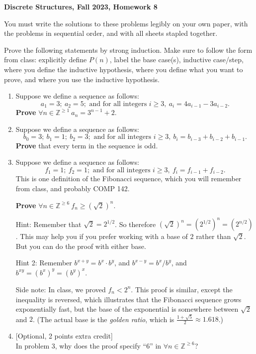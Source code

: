 \documentclass[12pt, letterpaper]{report}
\newcommand{\Z}{\mathbb{Z}}
\begin{document}
{\textbf{Discrete Structures, Fall 2023, Homework 8}}

\bigskip

You must write the solutions to these problems legibly on your own paper, with
the problems in sequential order, and with all sheets stapled together.

\bigskip

Prove the following statements by strong induction.  Make sure to follow the form from class:
explicitly define $P(n)$, label the base case(s), inductive case/step, where you define the inductive hypothesis, where you define what you want to 
prove,
and where you use the inductive hypothesis.  
\begin{enumerate}

\item Suppose we define a sequence as follows: 
$$
a_1 = 3; \ a_2 = 5; \text{ and for all integers }i \geq 3, \ a_i = 4a_{i-1} -3a_{i-2}. 
$$
\textbf{Prove} $\forall n \in \Z^{\geq 1} \ a_n = 3^{n-1}+2.$

\item Suppose we define a sequence as follows: 
$$
b_0 = 3; \ b_1 = 1; \ b_2 = 3; \text{ and for all integers }i \geq 3, \ b_i = b_{i-3} + b_{i-2}  +b_{i-1}. 
$$
\textbf{Prove} that every term in the sequence is odd.


\item Suppose we define a sequence as follows: 
$$
f_1 = 1; \ f_2=1; \text{ and for all integers }i \geq 3, \ f_i = f_{i-1}  + f_{i-2}.
$$
This is one definition of the Fibonacci sequence, which you will remember from class, and probably COMP 142.  

\textbf{Prove} $\forall n \in \Z^{\geq 6} \ f_n \geq (\sqrt{2})^n$.

Hint: Remember that $\sqrt{2} = 2^{1/2}$.  So therefore $(\sqrt{2})^n = (2^{1/2})^n = (2^{n/2})$. This may help you if you prefer working with a base
of $2$ rather than $\sqrt{2}$.  But you can do the proof with either base.

Hint 2: Remember $b^{x+y} = b^x \cdot b^y$, and $b^{x-y} = b^x/b^y$, and $b^{xy} = (b^x)^y = (b^y)^x$.

Side note: In class, we proved $f_n < 2^n$.  This proof is similar, except the inequality is reversed, which illustrates that
the Fibonacci sequence grows exponentially fast, but the base of the exponential is somewhere between $\sqrt{2}$ and $2$.
(The actual base is the \emph{golden ratio}, which is $\frac{1+\sqrt{5}}{2} \approx 1.618$.)

\item \phantom{} [Optional, 2 points extra credit] \\ In problem 3, why does the proof specify ``6'' in $\forall n \in \Z^{\geq 6}$?





\end{enumerate}
\end{document}

